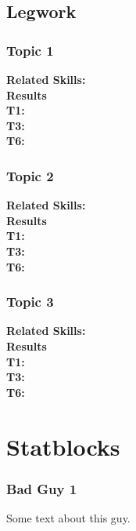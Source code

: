 \documentclass{ShadowTeXSR5}
\begin{document}
\section{Legwork}
\subsection{Topic 1}
\textbf{Related Skills:}\\
\textbf{Results}\\
\textbf{T1:}\\
\textbf{T3:}\\
\textbf{T6:}\\

\subsection{Topic 2}
\textbf{Related Skills:}\\
\textbf{Results}\\
\textbf{T1:}\\
\textbf{T3:}\\
\textbf{T6:}\\

\subsection{Topic 3}
\textbf{Related Skills:}\\
\textbf{Results}\\
\textbf{T1:}\\
\textbf{T3:}\\
\textbf{T6:}\\


\chapter{Statblocks}
\subsection{Bad Guy 1}
Some text about this guy.
\end{document}

